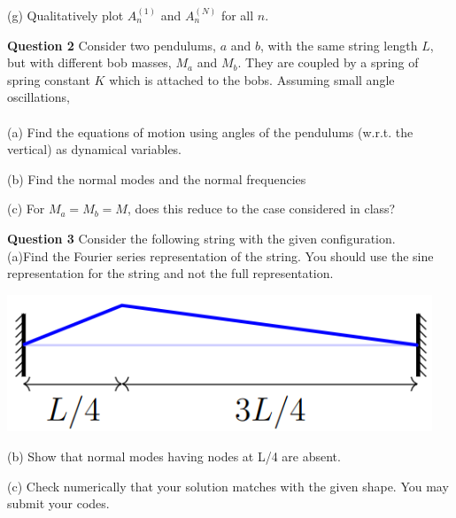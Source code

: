 \documentclass[addpoints]{exam}
\begin{document}
\begin{questions}
\begin{solution}
\end{solution}
(g) Qualitatively plot $A^{(1)}_n$ and $A^{(N)}_n$ for all $n$.
\begin{solution}
 
\end{solution}

\question\textbf{Question 2}
Consider two pendulums, $a$ and $b$, with the same string length $L$, but with different bob masses, $M_a$ and $M_b$. They are coupled by a spring of spring constant $K$ which 
is attached to the bobs. Assuming small angle oscillations, \\ \\ 
(a) Find the equations of motion using angles of the pendulums (w.r.t. the vertical) as dynamical variables.
\begin{solution}
 
\end{solution}
(b) Find the normal modes and the normal frequencies
\begin{solution}
    
\end{solution}
(c) For $M_a=M_b=M$, does this reduce to the case considered in class?
\begin{solution}
    
\end{solution}
\question\textbf{Question 3}
Consider the following string with the given configuration.\\
(a)Find the Fourier series representation of the string. You should use the sine representation for the string and not the full representation.\\ 
\begin{center}
    \includegraphics[width = 5.0in]{q2.png}
\end{center}
\begin{solution}
    
\end{solution}
(b) Show that normal modes having nodes at L/4 are absent.
\begin{solution}
 
\end{solution}
(c) Check numerically that your solution matches with the given shape. You may submit
your codes.
\begin{solution}
 

\end{solution}
\end{questions}
\end{document}
